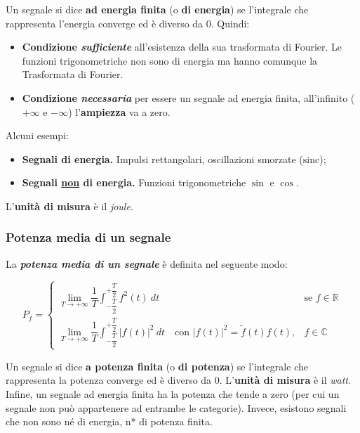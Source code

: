 \documentclass[a4paper]{article}
\begin{document}
	\noindent
	Un segnale si dice \textbf{ad energia finita} (o \textbf{di energia}) se l'integrale che rappresenta l'energia converge ed è diverso da $0$. Quindi:
	
	\begin{itemize}
		\item[\ding{43}] \textbf{Condizione \emph{sufficiente}} all'esistenza della sua trasformata di Fourier. Le funzioni trigonometriche non sono di energia ma hanno comunque la Trasformata di Fourier.
		\item[\ding{42}] \textbf{Condizione \emph{necessaria}} per essere un segnale ad energia finita, all'infinito ($+\infty$ e $-\infty$) l'\textbf{ampiezza} va a zero.
	\end{itemize}

	\noindent
	Alcuni esempi:

	\begin{itemize}
		\item[\ding{80}] \textbf{Segnali di energia.} Impulsi rettangolari, oscillazioni smorzate ($\mathrm{sinc}$);
		\item[\ding{80}] \textbf{Segnali \underline{non} di energia.} Funzioni trigonometriche $\sin$ e $\cos$.
	\end{itemize}

	\noindent
	L'\textbf{unità di misura} è il \emph{joule}.
	
	\subsubsection{Potenza media di un segnale}
	
	La \textbf{\emph{potenza media di un segnale}} è definita nel seguente modo:
	
	\begin{equation*}
		P_f =
		\begin{cases}
			\displaystyle \lim_{T \rightarrow +\infty} \dfrac{1}{T} \int_{-\dfrac{T}{2}}^{+\dfrac{T}{2}} f^{2}(t)\: dt & \text{se } f \in \mathbb{R} \\
			\displaystyle \lim_{T \rightarrow +\infty} \dfrac{1}{T} \int_{-\dfrac{T}{2}}^{+\dfrac{T}{2}} \left|f(t)\right|^{2}\: dt \hspace{1em} \text{con } \left| f(t) \right|^{2} = \tilde{f}(t) f(t), & f \in \mathbb{C}
		\end{cases}
	\end{equation*}
	
	\noindent
	Un segnale si dice \textbf{a potenza finita} (o \textbf{di potenza}) se l'integrale che rappresenta la potenza converge ed è diverso da $0$. L'\textbf{unità di misura} è il \emph{watt}.\newline
	Infine, un segnale ad energia finita ha la potenza che tende a zero (per cui un segnale non può appartenere ad entrambe le categorie). Invece, esistono segnali che non sono né di energia, n* di potenza finita.
	
\end{document}
